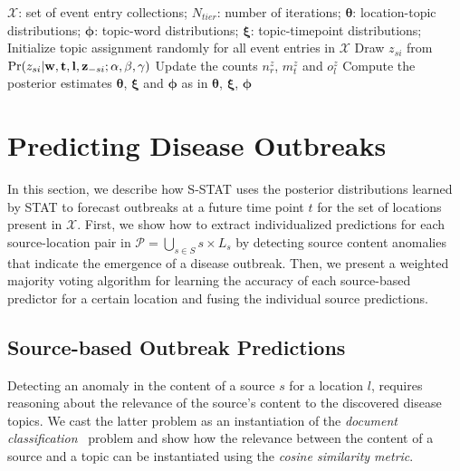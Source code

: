 \documentclass[conference]{IEEEtran}
\newcommand{\model}{{STAT}\xspace} %
\newcommand{\fullmodel}{{S-STAT}\xspace}
\newcommand{\w}{{\bf w}}
\newcommand{\z}{{\bf z}}
\newcommand{\loc}{{\bf l}}
\newcommand{\tim}{{\bf t}}
\begin{document}
\begin{algorithm}[h]
\caption{\model Gibbs Sampling Approximate Inference}
\begin{algorithmic}[1]
 $\mathcal{X}$: set of event entry collections; $N_{tier}$: number of iterations; 
 ${\boldsymbol \theta}$: location-topic distributions; ${\boldsymbol \phi}$: topic-word distributions; ${\boldsymbol \xi}$: topic-timepoint distributions;
\STATE Initialize topic assignment randomly for all event entries in $\mathcal{X}$
		\STATE Draw $z_{si}$ from $\Pr(z_{si}| \w,\tim,\loc,\z_{-si};\alpha,\beta,\gamma)$
		\STATE Update the counts $n^{z}_{r}$, $m^{z}_{t}$ and $o^z_l$
	\ENDFOR	
    \ENDFOR
\ENDFOR
\STATE Compute the posterior estimates ${\boldsymbol \theta}$, ${\boldsymbol \xi}$ and ${\boldsymbol \phi}$ as in 
\RETURN ${\boldsymbol \theta}$, ${\boldsymbol \xi}$, ${\boldsymbol \phi}$
\end{algorithmic}
\label{algo:gibbs}
\end{algorithm}


\section{Predicting Disease Outbreaks}
\label{sec:pred}
In this section, we describe how \fullmodel uses the posterior distributions learned by \model to forecast outbreaks at a future time point $t$ for the set of locations present in $\mathcal{X}$. 
First, we show how to extract individualized predictions for each source-location pair in $\mathcal{P} = \bigcup_{s \in S}s \times L_s$ by detecting source content anomalies that indicate the emergence of a disease outbreak. Then, we present a weighted majority voting algorithm for learning the accuracy of each source-based predictor for a certain location and fusing the individual source predictions.

\subsection{Source-based Outbreak Predictions}
\label{sec:source_pred}
Detecting an anomaly in the content of a source $s$ for a location $l$, requires reasoning about the relevance of the source's content to the discovered disease topics. We cast the latter problem as an instantiation of the {\em document classification}~\cite{strehl:2000} problem and show how the relevance between the content of a source and a topic can be instantiated using the {\em cosine similarity metric}.
\end{document}
